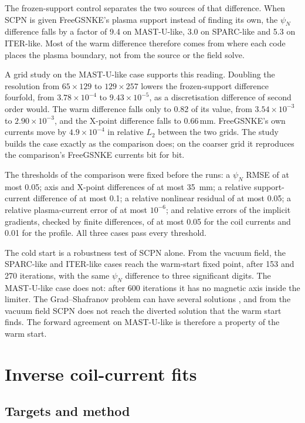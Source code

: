 \documentclass[11pt]{article}
\begin{document}
The frozen-support control separates the two sources of that difference.  When
SCPN is given FreeGSNKE's plasma support instead of finding its own, the
$\psi_N$ difference falls by a factor of 9.4 on MAST-U-like, 3.0 on SPARC-like
and 5.3 on ITER-like.  Most of the warm difference therefore comes from where
each code places the plasma boundary, not from the source or the field solve.

A grid study on the MAST-U-like case supports this reading.  Doubling the
resolution from $65 \times 129$ to $129 \times 257$ lowers the frozen-support
difference fourfold, from $3.78 \times 10^{-4}$ to $9.43 \times 10^{-5}$, as a
discretisation difference of second order would.  The warm difference falls
only to 0.82 of its value, from $3.54 \times 10^{-3}$ to $2.90 \times 10^{-3}$,
and the X-point difference falls to 0.66\,mm.  FreeGSNKE's own currents move by
$4.9 \times 10^{-4}$ in relative $L_2$ between the two grids.  The study builds
the case exactly as the comparison does; on the coarser grid it reproduces the
comparison's FreeGSNKE currents bit for bit.

The thresholds of the comparison were fixed before the runs: a $\psi_N$ RMSE of
at most 0.05; axis and X-point differences of at most 35~mm; a relative
support-current difference of at most 0.1; a relative nonlinear residual of at
most 0.05; a relative plasma-current error of at most $10^{-6}$; and relative
errors of the implicit gradients, checked by finite differences, of at most
0.05 for the coil currents and 0.01 for the profile.  All three cases pass every
threshold.

The cold start is a robustness test of SCPN alone.  From the vacuum field, the
SPARC-like and ITER-like cases reach the warm-start fixed point, after 153 and
270 iterations, with the same $\psi_N$ difference to three significant digits.
The MAST-U-like case does not: after 600 iterations it has no magnetic axis
inside the limiter.  The Grad--Shafranov problem can have several solutions
\citep{HamFarrell2024}, and from the vacuum field SCPN does not reach the
diverted solution that the warm start finds.
The forward agreement on MAST-U-like is therefore a property of the warm start.

\section{Inverse coil-current fits}

\subsection{Targets and method}
\end{document}
